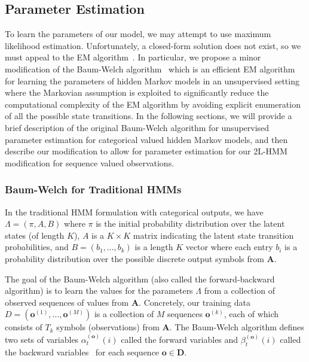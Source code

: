 \subsection{Parameter Estimation}
\label{sec:param-estimation}
To learn the parameters of our model, we may attempt to use maximum
likelihood estimation. Unfortunately, a closed-form solution does not
exist, so we must appeal to the EM algorithm~\cite{Dempster:1977:JRSS}. In
particular, we propose a minor modification of the Baum-Welch
algorithm~\cite{Rabiner:1990:RSR} which is an efficient EM algorithm
for learning the parameters of
hidden Markov models in an unsupervised setting where the Markovian assumption is exploited
 to significantly reduce the computational complexity of the EM algorithm by avoiding explicit enumeration of all the possible state transitions.  In the following sections,
we will provide a brief description of the original Baum-Welch algorithm
for unsupervised parameter estimation for categorical valued hidden Markov
models, and then describe our modification to allow for parameter
estimation for our 2L-HMM modification for sequence valued observations.

\subsubsection{Baum-Welch for Traditional HMMs}
In the traditional HMM formulation with categorical outputs, we have
$\Lambda = (\pi, A, B)$ where $\pi$ is the initial probability distribution
over the latent states (of length $K$), $A$ is a $K\times K$ matrix
indicating the latent state transition probabilities, and $B = (b_1,
\ldots, b_k)$ is a length $K$ vector where each entry $b_i$ is a
probability distribution over the possible discrete output symbols from
$\mathbf{A}$.

The goal of the Baum-Welch algorithm (also called the forward-backward
algorithm) is to learn the values for the parameters $\Lambda$ from a
collection of observed sequences of values from $\mathbf{A}$. Concretely,
our training data $D = (\mathbf{o}^{(1)}, \ldots, \mathbf{o}^{(M)})$ is a
collection of $M$ sequences $\mathbf{o}^{(k)}$, each of which consists of $T_k$
symbols (observations) from $\mathbf{A}$. The Baum-Welch algorithm defines
two sets of variables $\alpha^{(\mathbf{o})}_t(i)$ called the forward
variables and $\beta^{(\mathbf{o})}_t(i)$ called the backward
variables~\cite{Rabiner:1990:RSR} for each sequence $\mathbf{o} \in
\mathbf{D}$.


